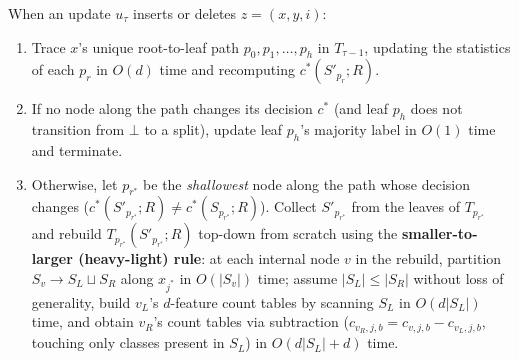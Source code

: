\documentclass[11pt]{article}
\theoremstyle{definition}
\begin{document}
When an update $u_\tau$ inserts or deletes $z = (x, y, i)$:
\begin{enumerate}[leftmargin=1.5em,itemsep=2pt]
    \item Trace $x$'s unique root-to-leaf path $p_0, p_1, \dots, p_h$ in $T_{\tau-1}$, updating the statistics of each $p_r$ in $O(d)$ time and recomputing $c^*(S'_{p_r}; R)$.
    \item If no node along the path changes its decision $c^*$ (and leaf $p_h$ does not transition from $\bot$ to a split), update leaf $p_h$'s majority label in $O(1)$ time and terminate.
    \item Otherwise, let $p_{r^*}$ be the \emph{shallowest} node along the path whose decision changes ($c^*(S'_{p_{r^*}}; R) \ne c^*(S_{p_{r^*}}; R)$). Collect $S'_{p_{r^*}}$ from the leaves of $T_{p_{r^*}}$ and rebuild $T_{p_{r^*}}(S'_{p_{r^*}}; R)$ top-down from scratch using the \textbf{smaller-to-larger (heavy-light) rule}: at each internal node $v$ in the rebuild, partition $S_v \to S_L \sqcup S_R$ along $x_{j^*}$ in $O(|S_v|)$ time; assume $|S_L| \le |S_R|$ without loss of generality, build $v_L$'s $d$-feature count tables by scanning $S_L$ in $O(d|S_L|)$ time, and obtain $v_R$'s count tables via subtraction ($c_{v_R, j, b} = c_{v, j, b} - c_{v_L, j, b}$, touching only classes present in $S_L$) in $O(d|S_L| + d)$ time.
\end{enumerate}
\end{document}
